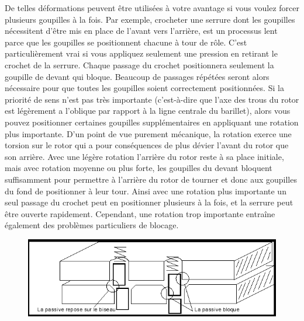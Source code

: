 \documentclass[a4paper,french,11pt,twoside]{report}
\begin{document}
De telles déformations peuvent être utilisées à votre avantage si vous voulez forcer plusieurs goupilles à la fois. Par exemple, crocheter une serrure dont les goupilles nécessitent d'être mis en place de l'avant vers l'arrière, est un processus lent parce que les goupilles se positionnent chacune à tour de rôle. C'est particulièrement vrai si vous appliquez seulement une pression en retirant le crochet de la serrure. Chaque passage du crochet positionnera seulement la goupille de devant qui bloque. Beaucoup de passages répétées seront alors nécessaire pour que toutes les goupilles soient correctement positionnées. Si la priorité de sens n'est pas très importante (c'est-à-dire que l'axe des trous du rotor est légèrement a l'oblique par rapport à la ligne centrale du barillet), alors vous pouvez positionner certaines goupilles supplémentaires en appliquant une rotation plus importante. D'un point de vue purement mécanique, la rotation exerce une torsion sur le rotor qui a pour conséquences de plus dévier l'avant du rotor que son arrière. Avec une légère rotation l'arrière du rotor reste à sa place initiale, mais avec rotation moyenne ou plus forte, les goupilles du devant bloquent suffisamment pour permettre à l'arrière du rotor de tourner et donc aux goupilles du fond de positionner à leur tour. Ainsi avec une rotation plus importante un seul passage du crochet peut en positionner plusieurs à la fois, et la serrure peut être ouverte rapidement. Cependant, une rotation trop importante entraîne également des problèmes particuliers de blocage.

\begin{figure}[h] \begin{center}
        \includegraphics[scale=0.7]{images/Image21}
        \caption{}
\end{center} \end{figure}
\end{document}
